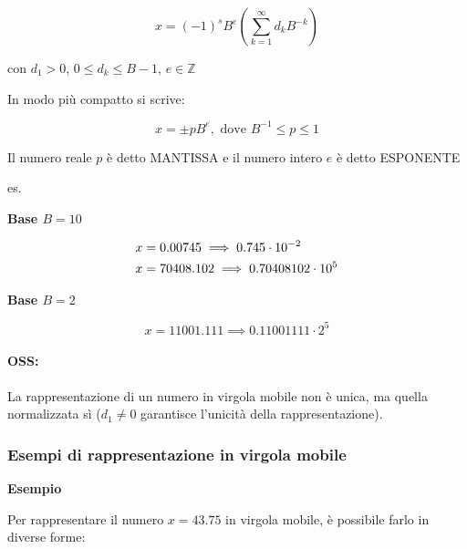 \documentclass[a4paper, 11pt]{article}
\begin{document}
            \[
                x = (-1)^s B^e \left (\sum_{k = 1}^{\infty}d_k B^{-k} \right )
            \]



            con $d_1 > 0$, $0 \leq d_k \leq B-1$, $e \in \mathbb{Z}$

            In modo più compatto si scrive:



            \[
                x = \pm p B^e, \text{ dove } B^{-1} \leq p \leq 1
            \]



            Il numero reale $p$ è detto MANTISSA e il numero intero $e$ è detto ESPONENTE
            
            \pagebreak
            es. 

            \hspace{2em} \textbf{Base \( B = 10 \)}
            

            
            \begin{align}
                x &= 0.00745 \implies 0.745 \cdot 10^{-2} \notag \\
                x &= 70408.102 \implies 0.70408102 \cdot 10^{5} \notag
            \end{align}
            
            
            
            \hspace{2em} \textbf{Base \( B = 2 \)}
            
            
            \[
            x = 11001.111 \implies 0.11001111 \cdot 2^{5}
            \]

            \paragraph{OSS: }  La rappresentazione di un numero in virgola mobile non è unica, ma quella
            normalizzata sì ($d_1 \neq 0$ garantisce l'unicità della rappresentazione).

            \subsubsection*{Esempi di rappresentazione in virgola mobile}

            \textbf{Esempio}

            Per rappresentare il numero \(x = 43.75\) in virgola mobile, è possibile farlo in diverse forme:
\end{document}
